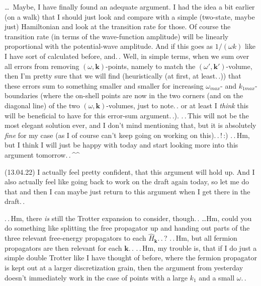 \documentclass{report}
\begin{document}
\ldots\ Maybe, I have finally found an adequate argument. I had the idea a bit earlier (on a walk) that I should just look and compare with a simple (two-state, maybe just) Hamiltonian and look at the transition rate for those. Of course the transition rate (in terms of the wave-function amplitude) will be linearly proportional with the potential-wave amplitude. And if this goes as $1/(\omega k)$ like I have sort of calculated before, and.\,. Well, in simple terms, when we sum over all errors from removing $(\omega, \boldsymbol{k})$-points, namely to match the $(\omega', \boldsymbol{k}')$-volume, then I'm pretty sure that we will find (heuristically (at first, at least.\,.)) that these errors sum to something smaller and smaller for increasing $\omega_{max}$- and $k_{1 max}$-boundaries (where the on-shell points are now in the two corners (and on the diagonal line) of the two $(\omega, \boldsymbol{k})$-volumes, just to note.\,. or at least I \emph{think} this will be beneficial to have for this error-sum argument.\,.). .\,.\,This will not be the most elegant solution ever, and I don't mind mentioning that, but it is absolutely \emph{fine} for my case (as I of course can't keep going on %
working on 
this).\,.\,!\,:) .\,.\,Hm, but I think I will just be happy with today and start looking more into this argument tomorrow.\,.\,\textasciicircum\textasciicircum


(13.04.22) I actually feel pretty confident, that this argument will hold up. And I also actually feel like going back to work on the draft again today, so let me do that and then I can maybe just return to this argument when I get there in the draft.\,. 

.\,.\,Hm, there \emph{is} still the Trotter expansion to consider, though.\,.
\ldots Hm, could you do something like splitting the free propagator up and handing out parts of the three relevant free-energy propagators to each $\hat H_{\boldsymbol{k}}$.\,.\,? %
.\,.\,Hm, but all fermion propagators are then relevant for each $\boldsymbol{k}$.\,. .\,.\,Hm, my trouble is, that if I do just a simple double Trotter like I have thought of before, where the fermion propagator is kept out at a larger discretization grain, then the argument from yesterday doesn't immediately work in the case of points with a large $k_1$ and a small $\omega$.\,. 
\end{document}
